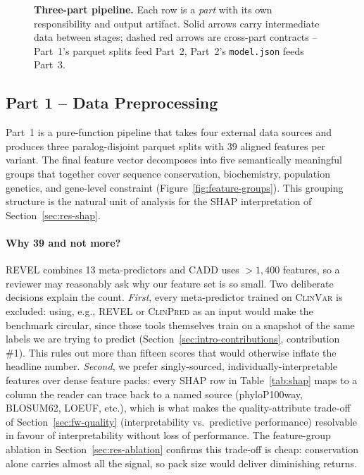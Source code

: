 \documentclass[11pt,a4paper,oneside]{report}
\begin{document}
\begin{figure}[htbp]
\caption[Three-part pipeline]{\textbf{Three-part pipeline.}
Each row is a \emph{part} with its own responsibility and
output artifact. Solid arrows carry intermediate data
between stages; dashed red arrows are cross-part contracts
-- Part~1's parquet splits feed Part~2, Part~2's
\texttt{model.json} feeds Part~3.}
\label{fig:pipeline}
\end{figure}

\subsection{Part 1 -- Data Preprocessing}
\label{sec:fw-part1}

Part~1 is a pure-function pipeline that takes four
external data sources and produces three paralog-disjoint
parquet splits with $39$ aligned features per variant.
The final feature vector decomposes into five semantically
meaningful groups that together cover sequence
conservation, biochemistry, population genetics, and
gene-level constraint (Figure~\ref{fig:feature-groups}).
This grouping structure is the natural unit of analysis
for the SHAP interpretation of Section~\ref{sec:res-shap}.

\paragraph{Why 39 and not more?} REVEL combines 13
meta-predictors and CADD uses $>\!1{,}400$ features, so a
reviewer may reasonably ask why our feature set is so
small. Two deliberate decisions explain the count.
\emph{First}, every meta-predictor trained on
\textsc{ClinVar} is excluded: using, e.g., REVEL or
\textsc{ClinPred} as an input would make the benchmark
circular, since those tools themselves train on a
snapshot of the same labels we are trying to predict
(Section~\ref{sec:intro-contributions}, contribution
\#1). This rules out more than fifteen scores that would
otherwise inflate the headline number. \emph{Second}, we
prefer singly-sourced, individually-interpretable
features over dense feature packs: every SHAP row in
Table~\ref{tab:shap} maps to a column the reader can
trace back to a named source (phyloP100way, BLOSUM62,
LOEUF, etc.), which is what makes the
quality-attribute trade-off of
Section~\ref{sec:fw-quality} (interpretability vs.\
predictive performance) resolvable in favour of
interpretability without loss of performance. The
feature-group ablation in Section~\ref{sec:res-ablation}
confirms this trade-off is cheap: conservation alone
carries almost all the signal, so pack size would
deliver diminishing returns.
\end{document}

